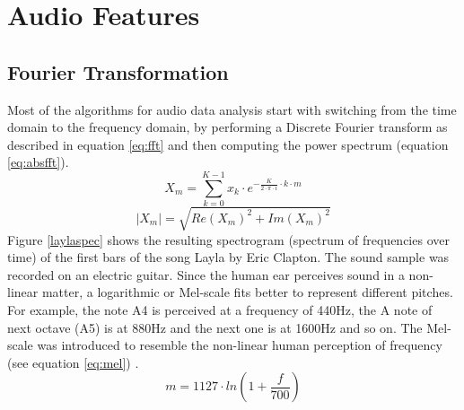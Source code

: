 \section{Audio Features}

\subsection{Fourier Transformation}\label{featsec}

Most of the algorithms for audio data analysis start with switching from the time domain to the frequency domain, by performing a Discrete Fourier transform as described in equation \ref{eq:fft} and then computing the power spectrum (equation \ref{eq:absfft}).
\begin{equation} \label{eq:fft}
X_m = \sum_{k=0}^{K-1}{x_k \cdot e^ { - \frac{K}{ 2 \cdot \pi \cdot i}\cdot k\cdot m}}
\end{equation}
\begin{equation} \label{eq:absfft}
|X_m| = \sqrt{Re(X_m)^2 + Im(X_m)^2}
\end{equation}
Figure \ref{laylaspec} shows the resulting spectrogram (spectrum of frequencies over time) of the first bars of the song Layla by Eric Clapton. The sound sample was recorded on an electric guitar. Since the human ear perceives sound in a non-linear matter, a logarithmic or Mel-scale fits better to represent different pitches. For example, the note A4 is perceived at a frequency of 440Hz, the A note of next octave (A5) is at 880Hz and the next one is at 1600Hz and so on. The Mel-scale was introduced to resemble the non-linear human perception of frequency (see equation \ref{eq:mel}) \cite[pp. 53f]{knees1}.
\begin{equation} \label{eq:mel}
m = 1127 \cdot ln(1 + \frac{f}{700})
\end{equation}
